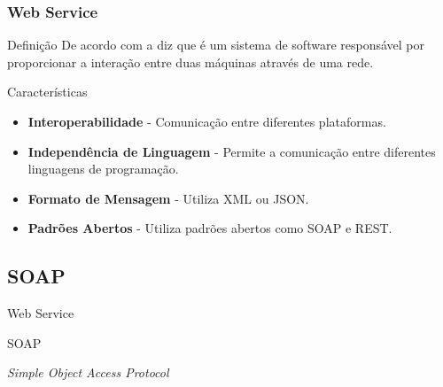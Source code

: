 \documentclass[
	10pt, %
	t, %
]{beamer}
\begin{document}
\begin{frame}
	\frametitle{Web Service}

	\begin{block}{Definição}
		De acordo com a \cite{W3C2024} diz que é um sistema de software responsável por proporcionar a \alert{interação entre duas máquinas} através de uma rede. 
	\end{block}

	\begin{block}{Características}
		\begin{itemize}
			\item \textbf{Interoperabilidade} - Comunicação entre diferentes plataformas.
			\item \textbf{Independência de Linguagem} - Permite a comunicação entre diferentes linguagens de programação.
			\item \textbf{Formato de Mensagem} - Utiliza XML ou JSON.
			\item \textbf{Padrões Abertos} - Utiliza padrões abertos como SOAP e REST.
		\end{itemize}
	\end{block}

\end{frame}


\subsection{SOAP}

\begin{frame}
	\begin{center}
		
		\bigskip\bigskip\bigskip\bigskip %
		{\Large Web Service}
		
		\bigskip\bigskip %
		{\Huge SOAP}
		
		\smallskip
		{\small \textit{Simple Object Access Protocol}}
	\end{center}

\end{frame}
\end{document}
